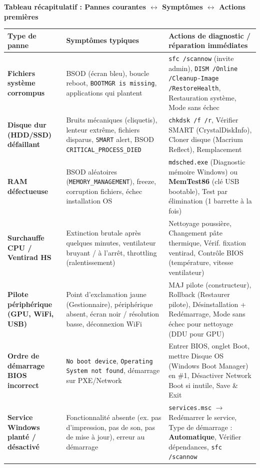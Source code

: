 \documentclass[11pt]{article}
\begin{document}
\begin{bilan}
\textbf{Tableau récapitulatif : Pannes courantes $\leftrightarrow$ Symptômes $\leftrightarrow$ Actions premières}

\begin{center}
\begin{tabularx}{\linewidth}{|>{\bfseries}l|X|X|}
\hline
\rowcolor{popblueL}
\textbf{Type de panne} & \textbf{Symptômes typiques} & \textbf{Actions de diagnostic / réparation immédiates} \\
\hline
Fichiers système corrompus & BSOD (écran bleu), boucle reboot, \texttt{BOOTMGR is missing}, applications qui plantent & \texttt{sfc /scannow} (invite admin), \texttt{DISM /Online /Cleanup-Image /RestoreHealth}, Restauration système, Mode sans échec \\
\hline
Disque dur (HDD/SSD) défaillant & Bruits mécaniques (cliquetis), lenteur extrême, fichiers disparus, \texttt{SMART} alert, BSOD \texttt{CRITICAL\_PROCESS\_DIED} & \texttt{chkdsk /f /r}, Vérifier SMART (CrystalDiskInfo), Cloner disque (Macrium Reflect), Remplacement \\
\hline
RAM défectueuse & BSOD aléatoires (\texttt{MEMORY\_MANAGEMENT}), freeze, corruption fichiers, échec installation OS & \texttt{mdsched.exe} (Diagnostic mémoire Windows) ou \textbf{MemTest86} (clé USB bootable), Test par élimination (1 barrette à la fois) \\
\hline
Surchauffe CPU / Ventirad HS & Extinction brutale après quelques minutes, ventilateur bruyant / à l'arrêt, throttling (ralentissement) & Nettoyage poussière, Changement pâte thermique, Vérif. fixation ventirad, Contrôle BIOS (température, vitesse ventilateur) \\
\hline
Pilote périphérique (GPU, WiFi, USB) & Point d'exclamation jaune (Gestionnaire), périphérique absent, écran noir / résolution basse, déconnexion WiFi & MAJ pilote (constructeur), Rollback (Restaurer pilote), Désinstallation + Redémarrage, Mode sans échec pour nettoyage (DDU pour GPU) \\
\hline
Ordre de démarrage BIOS incorrect & \texttt{No boot device}, \texttt{Operating System not found}, démarrage sur PXE/Network & Entrer BIOS, onglet Boot, mettre Disque OS (Windows Boot Manager) en \#1, Désactiver Network Boot si inutile, Save \& Exit \\
\hline
Service Windows planté / désactivé & Fonctionnalité absente (ex. pas d'impression, pas de son, pas de mise à jour), erreur au démarrage & \texttt{services.msc} $\rightarrow$ Redémarrer le service, Type de démarrage : \textbf{Automatique}, Vérifier dépendances, \texttt{sfc /scannow} \\
\hline
\end{tabularx}
\end{center}

\end{bilan}
\end{document}
